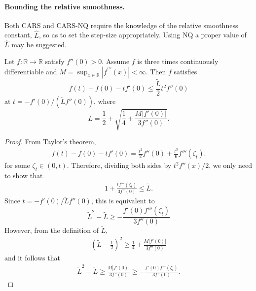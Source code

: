 \paragraph{Bounding the relative smoothness.} Both CARS and CARS-NQ require the knowledge of the relative smoothness constant, $\hat{L}$, so as to set the step-size appropriately. Using NQ a proper value of $\hat{L}$ may be suggested.
\vspace{3mm}
\begin{proposition}\label{prop: approximating Lhat}
    Let $f:\mathbb{R}\rightarrow\mathbb{R}$ satisfy $f''(0)>0$. Assume $f$ is three times continuously differentiable and $M = \sup_{x\in\mathbb{R}}|f^{\prime\prime\prime}(x)|<\infty$. Then $f$ satisfies
    \begin{equation*}
        f(t) - f(0) - tf'(0) \leq \frac{\tilde{L}}{2}t^2f''(0)
    \end{equation*}
    at $t = -{f'(0)}/{(\tilde{L}f''(0))}$, where
    \begin{equation*}
        \tilde{L} = \frac{1}{2} + \sqrt{\frac{1}{4} + \frac{M|f'(0)|}{3f''(0)}}.
    \end{equation*}
\end{proposition}
\begin{proof}
    From Taylor's theorem,
    \begin{align*}
        f(t) - f(0) - tf'(0) = \frac{t^2}{2}f''(0) + \frac{t^3}{6}f'''(\zeta_t).
    \end{align*}
    for some $\zeta_t \in (0, t)$. Therefore, dividing both sides by $t^2f''(x)/2$, we only need to show that
    \begin{align*}
        1 + \frac{t f'''(\zeta_t)}{3f''(0)} \leq \tilde{L}.
    \end{align*}
    Since $ t = -f'(0)/\tilde{L}f''(0)$, this is equivalent to
    \begin{equation*}
        \tilde{L}^2 - \tilde{L} \geq  -\frac{ f'(0)f'''(\zeta_t)}{3f''(0)}
    \end{equation*}
    However,  from the definition of $\tilde{L}$,
    \begin{align*}
        \left(\tilde{L}-\frac{1}{2}\right)^2 \geq \frac{1}{4} + \frac{M|f'(0)|}{3f''(0)}
    \end{align*} and it follows that
    \begin{align*}
        \tilde{L}^2 - \tilde{L} \geq \frac{M|f'(0)|}{3f''(0)} \geq  -\frac{ f'(0)f'''(\zeta_t)}{3f''(0)}.
    \end{align*}

\end{proof}

